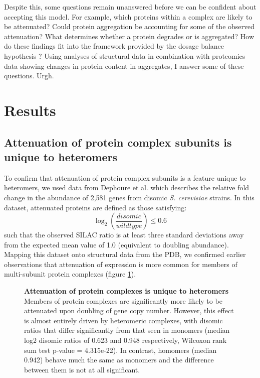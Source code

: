 \documentclass[a4paper,11pt,twoside,openright]{scrbook}
\begin{document}
Despite this, some questions remain unanswered before we can be confident about accepting this model. For example, which proteins within a complex are likely to be attenuated? Could protein aggregation be accounting for some of the observed attenuation? What determines whether a protein degrades or is aggregated? How do these findings fit into the framework provided by the dosage balance hypothesis \cite{Papp2003}? Using analyses of structural data in combination with proteomics data showing changes in protein content in aggregates, I answer some of these questions. Urgh.

\section{Results}

\subsection{Attenuation of protein complex subunits is unique to heteromers}
To confirm that attenuation of protein complex subunits is a feature unique to heteromers, we used data from Dephoure et al. \cite{Dephoure2014} which describes the relative fold change in the abundance of 2,581 genes from disomic \textit{S. cerevisiae} strains. In this dataset, attenuated proteins are defined as those satisfying:
\begin{displaymath}
    \log_{2} \left( \frac{disomic}{wildtype} \right) \leq 0.6
\end{displaymath}
such that the observed SILAC ratio is at least three standard deviations away from the expected mean value of 1.0 (equivalent to doubling abundance). Mapping this dataset onto structural data from the PDB, we confirmed earlier observations that attenuation of expression is more common for members of multi-subunit protein complexes (figure \ref{c5f1}).

\begin{figure}[h]
    \caption[Attenuation of protein complexes is unique to heteromers]{\sffamily \textbf{Attenuation of protein complexes is unique to heteromers} \\ \small Members of protein complexes are significantly more likely to be attenuated upon doubling of gene copy number. However, this effect is almost entirely driven by heteromeric complexes, with disomic ratios that differ significantly from that seen in monomers (median log2 disomic ratios of 0.623 and 0.948 respectively, Wilcoxon rank sum test p-value = 4.315e-22). In contrast, homomers (median 0.942) behave much the same as monomers and the difference between them is not at all significant.}
    \label{c5f1}
\end{figure}
\end{document}
